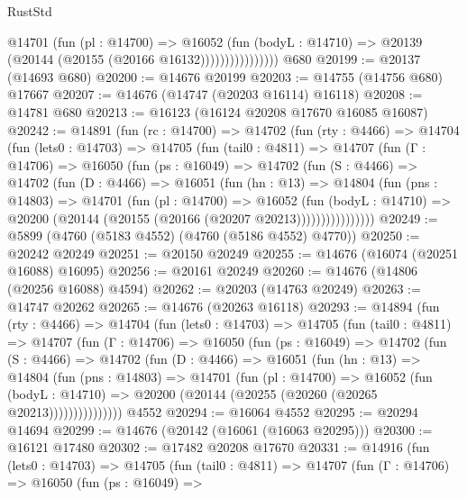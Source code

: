 \begin{lexlean}{RustStd}
\begin{coremodule}
                        @14701
                          (fun (pl : @14700) =>
                          @16052
                            (fun (bodyL : @14710) =>
                            @20139 (@20144 (@20155 (@20166 @16132))))))))))))))))
    @680
@20199 := @20137 (@14693 @680)
@20200 := @14676 @20199
@20203 := @14755 (@14756 @680) @17667
@20207 := @14676 (@14747 (@20203 @16114) @16118)
@20208 := @14781 @680
@20213 := @16123 (@16124 @20208 @17670 @16085 @16087)
@20242 := @14891
    (fun (rc : @14700) =>
    @14702
      (fun (rty : @4466) =>
      @14704
        (fun (lets0 : @14703) =>
        @14705
          (fun (tail0 : @4811) =>
          @14707
            (fun (Γ : @14706) =>
            @16050
              (fun (ps : @16049) =>
              @14702
                (fun (S : @4466) =>
                @14702
                  (fun (D : @4466) =>
                  @16051
                    (fun (hn : @13) =>
                    @14804
                      (fun (pns : @14803) =>
                      @14701
                        (fun (pl : @14700) =>
                        @16052
                          (fun (bodyL : @14710) =>
                          @20200 (@20144 (@20155 (@20166 (@20207 @20213))))))))))))))))
@20249 := @5899 (@4760 (@5183 @4552) (@4760 (@5186 @4552) @4770))
@20250 := @20242 @20249
@20251 := @20150 @20249
@20255 := @14676 (@16074 (@20251 @16088) @16095)
@20256 := @20161 @20249
@20260 := @14676 (@14806 (@20256 @16088) @4594)
@20262 := @20203 (@14763 @20249)
@20263 := @14747 @20262
@20265 := @14676 (@20263 @16118)
@20293 := @14894
    (fun (rty : @4466) =>
    @14704
      (fun (lets0 : @14703) =>
      @14705
        (fun (tail0 : @4811) =>
        @14707
          (fun (Γ : @14706) =>
          @16050
            (fun (ps : @16049) =>
            @14702
              (fun (S : @4466) =>
              @14702
                (fun (D : @4466) =>
                @16051
                  (fun (hn : @13) =>
                  @14804
                    (fun (pns : @14803) =>
                    @14701
                      (fun (pl : @14700) =>
                      @16052
                        (fun (bodyL : @14710) =>
                        @20200 (@20144 (@20255 (@20260 (@20265 @20213)))))))))))))))
    @4552
@20294 := @16064 @4552
@20295 := @20294 @14694
@20299 := @14676 (@20142 (@16061 (@16063 @20295)))
@20300 := @16121 @17480
@20302 := @17482 @20208 @17670
@20331 := @14916
    (fun (lets0 : @14703) =>
    @14705
      (fun (tail0 : @4811) =>
      @14707
        (fun (Γ : @14706) =>
        @16050
          (fun (ps : @16049) =>

\end{coremodule}
\end{lexlean}
